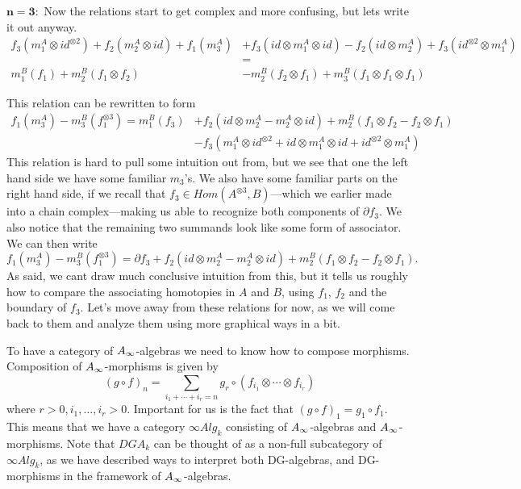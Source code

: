$\mathbf{n=3:}$ Now the relations start to get complex and more confusing, but lets write it out anyway. 
\begin{align*}
    f_3(m_1^A\otimes id^{\otimes 2})
    +f_2(m_2^A\otimes id)
    +f_1(m_3^A)
    &+f_3(id\otimes m_1^A\otimes id)
    -f_2(id\otimes m_2^A)
    +f_3(id^{\otimes 2}\otimes m_1^A) \\
    &= \\
    m_1^B(f_1)
    +m_2^B(f_1\otimes f_2) 
    &-m_2^B(f_2\otimes f_1)
    +m_3^B(f_1\otimes f_1\otimes f_1)
\end{align*}

This relation can be rewritten to form 
\begin{align*}
    f_1(m_3^A)
    -m_3^B(f_1^{\otimes 3})
    = 
    m_1^B(f_3)
    &+f_2(id\otimes m_2^A-m_2^A\otimes id)
    +m_2^B(f_1\otimes f_2 - f_2\otimes f_1) \\
    &-f_3(m_1^A\otimes id^{\otimes 2}+id\otimes m_1^A\otimes id+id^{\otimes 2}\otimes m_1^A)
\end{align*}
This relation is hard to pull some intuition out from, but we see that one the left hand side we have some familiar $m_3$'s. We also have some familiar parts on the right hand side, if we recall that $f_3\in Hom(A^{\otimes 3}, B)$---which we earlier made into a chain complex---making us able to recognize both components of $\partial f_3$. We also notice that the remaining two summands look like some form of associator. We can then write
\begin{equation*}
    f_1(m_3^A)-m_3^B(f_1^{\otimes 3}) = \partial f_3 + f_2(id\otimes m_2^A-m_2^A\otimes id)
    +m_2^B(f_1\otimes f_2 - f_2\otimes f_1).
\end{equation*}
As said, we cant draw much conclusive intuition from this, but it tells us roughly how to compare the associating homotopies in $A$ and $B$, using $f_1$, $f_2$ and the boundary of $f_3$. Let's move away from these relations for now, as we will come back to them and analyze them using more graphical ways in a bit. 

To have a category of $A_{\infty}$-algebras we need to know how to compose morphisms. Composition of $A_{\infty}$-morphisms is given by 
\begin{equation*}
    (g\circ f)_n = \sum_{i_1+\cdots + i_r = n}g_r\circ (f_{i_1}\otimes \cdots \otimes f_{i_r})
\end{equation*}
where $r>0, i_1, \ldots, i_r>0$. Important for us is the fact that $(g\circ f)_1 = g_1\circ f_1$. This means that we have a category $\infty Alg_k$ consisting of $A_{\infty}$-algebras and $A_{\infty}$-morphisms. Note that $DGA_k$ can be thought of as a non-full subcategory of $\infty Alg_k$, as we have described ways to interpret both DG-algebras, and DG-morphisms in the framework of $A_{\infty}$-algebras.  

